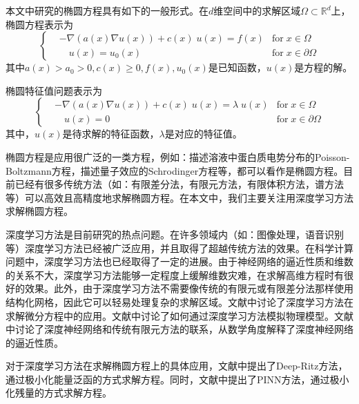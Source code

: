 


本文中研究的椭圆方程具有如下的一般形式。在$d$维空间中的求解区域$\Omega \subset \mathbb{R}^d$上，椭圆方程表示为
\begin{equation}\label{prob1}
\left\{
\begin{split}
& -\nabla(a(x) \nabla u(x)) + c(x) \; u(x) = f(x) & \text{for} \; x \in \Omega \\
& \quad u(x) = u_0(x) & \text{for} \; x \in \partial \Omega
\end{split}
\right.
\end{equation}
其中$a(x) > a_0 > 0, c(x) \geq 0, f(x), u_0(x)$是已知函数，$u(x)$是方程的解。

椭圆特征值问题表示为
\begin{equation}\label{prob2}
\left\{
\begin{split}
& -\nabla(a(x) \nabla u(x)) + c(x) \; u(x) = \lambda \; u(x) & \text{for} \; x \in \Omega \\
& \quad u(x) = 0 & \text{for} \; x \in \partial \Omega
\end{split}
\right.
\end{equation}
其中，$u(x)$是待求解的特征函数，$\lambda$是对应的特征值。

椭圆方程是应用很广泛的一类方程，例如：描述溶液中蛋白质电势分布的Poisson-Boltzmann方程\cite{cai2013}，描述量子效应的Schrodinger方程等，都可以看作是椭圆方程。目前已经有很多传统方法（如：有限差分法，有限元方法，有限体积方法，谱方法等）可以高效且高精度地求解椭圆方程。在本文中，我们主要关注用深度学习方法求解椭圆方程。

深度学习方法是目前研究的热点问题。在许多领域内（如：图像处理，语音识别等）深度学习方法已经被广泛应用，并且取得了超越传统方法的效果。在科学计算问题中，深度学习方法也已经取得了一定的进展。由于神经网络的逼近性质和维数的关系不大，深度学习方法能够一定程度上缓解维数灾难，在求解高维方程时有很好的效果。此外，由于深度学习方法不需要像传统的有限元或有限差分法那样使用结构化网格，因此它可以轻易处理复杂的求解区域。文献\cite{weinan2017deep, han2018solving, wang2020mesh}中讨论了深度学习方法在求解微分方程中的应用。文献\cite{han2018deep, strofer2019data}中讨论了如何通过深度学习方法模拟物理模型。文献\cite{he2018relu, hamilton2019dnn}中讨论了深度神经网络和传统有限元方法的联系，从数学角度解释了深度神经网络的逼近性质。

对于深度学习方法在求解椭圆方程上的具体应用，文献\cite{weinan2018deep, liao2019deep}中提出了Deep-Ritz方法，通过极小化能量泛函的方式求解方程。同时，文献\cite{raissi2019physics}中提出了PINN方法，通过极小化残量的方式求解方程。


